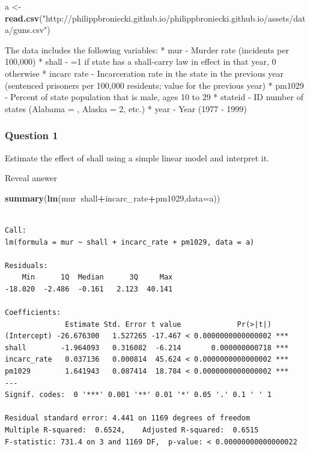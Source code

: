 \documentclass[]{article}
\newenvironment{Shaded}{\begin{snugshade}}{\end{snugshade}}
\newcommand{\KeywordTok}[1]{\textcolor[rgb]{0.13,0.29,0.53}{\textbf{#1}}}
\newcommand{\DataTypeTok}[1]{\textcolor[rgb]{0.13,0.29,0.53}{#1}}
\newcommand{\StringTok}[1]{\textcolor[rgb]{0.31,0.60,0.02}{#1}}
\newcommand{\OperatorTok}[1]{\textcolor[rgb]{0.81,0.36,0.00}{\textbf{#1}}}
\newcommand{\NormalTok}[1]{#1}
\theoremstyle{definition}
\theoremstyle{definition}
\theoremstyle{definition}
\theoremstyle{remark}
\begin{document}
\begin{Shaded}
\begin{Highlighting}[]
\NormalTok{a <-}\StringTok{ }\KeywordTok{read.csv}\NormalTok{(}\StringTok{"http://philippbroniecki.github.io/philippbroniecki.github.io/assets/data/guns.csv"}\NormalTok{)}
\end{Highlighting}
\end{Shaded}

The data includes the following variables: * mur - Murder rate
(incidents per 100,000) * shall - =1 if state has a shall-carry law in
effect in that year, 0 otherwise * incarc rate - Incarceration rate in
the state in the previous year (sentenced prisoners per 100,000
residents; value for the previous year) * pm1029 - Percent of state
population that is male, ages 10 to 29 * stateid - ID number of states
(Alabama = , Alaska = 2, etc.) * year - Year (1977 - 1999)

\subsubsection{Question 1}\label{question-1-1}

Estimate the effect of shall using a simple linear model and interpret
it.

 Reveal answer

\begin{Shaded}
\begin{Highlighting}[]
\KeywordTok{summary}\NormalTok{(}\KeywordTok{lm}\NormalTok{(mur}\OperatorTok{~}\NormalTok{shall}\OperatorTok{+}\NormalTok{incarc_rate}\OperatorTok{+}\NormalTok{pm1029,}\DataTypeTok{data=}\NormalTok{a))}
\end{Highlighting}
\end{Shaded}

\begin{verbatim}

Call:
lm(formula = mur ~ shall + incarc_rate + pm1029, data = a)

Residuals:
    Min      1Q  Median      3Q     Max 
-18.020  -2.486  -0.161   2.123  40.141 

Coefficients:
              Estimate Std. Error t value             Pr(>|t|)    
(Intercept) -26.676300   1.527265 -17.467 < 0.0000000000000002 ***
shall        -1.964093   0.316082  -6.214       0.000000000718 ***
incarc_rate   0.037136   0.000814  45.624 < 0.0000000000000002 ***
pm1029        1.641943   0.087414  18.784 < 0.0000000000000002 ***
---
Signif. codes:  0 '***' 0.001 '**' 0.01 '*' 0.05 '.' 0.1 ' ' 1

Residual standard error: 4.441 on 1169 degrees of freedom
Multiple R-squared:  0.6524,    Adjusted R-squared:  0.6515 
F-statistic: 731.4 on 3 and 1169 DF,  p-value: < 0.00000000000000022
\end{verbatim}
\end{document}
